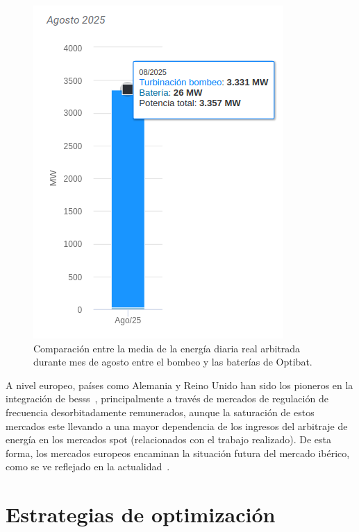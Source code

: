 \begin{figure}
  \centering
  \includegraphics[width=0.5\linewidth]{figures/comparacion-energia-ciclada.png}
  \caption{Comparación entre la media de la energía diaria real arbitrada durante mes de agosto entre el bombeo y las baterías de Optibat.}
  \label{fig:comparacion-energia-ciclada}
\end{figure}

A nivel europeo, países como Alemania y Reino Unido han sido los pioneros en la integración de \glspl{bess}~\cite{kivipelto2017grid, tejada2019review}, principalmente a través de mercados de regulación de frecuencia desorbitadamente remunerados, aunque la saturación de estos mercados este llevando a una mayor dependencia de los ingresos del arbitraje de energía en los mercados spot (relacionados con el trabajo realizado). De esta forma, los mercados europeos encaminan la situación futura del mercado ibérico, como se ve reflejado en la actualidad~\cite{kumar2019strategic}.

\section{Estrategias de optimización}
\label{makereference2.2}

